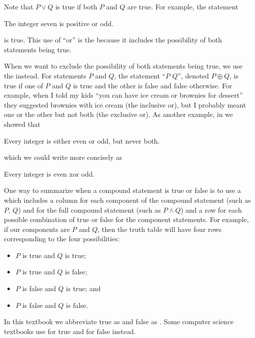 \begin{defn}
\begin{apart}
        \item Note that $P \lor Q$ is true if both $P$ and $Q$ are true.  For example, the statement 
            \begin{center}
                The integer seven is positive or odd.
            \end{center} 
        is true.  This use of ``or'' is the  because it includes the possibility of both statements being true.
        
        \item When we want to exclude the possibility of both statements being true, we use the  instead. For statements $P$ and $Q$, the statement ``$P$  $Q$'', denoted $P \oplus Q$, is true if one of $P$ and $Q$ is true and the other is false and false otherwise.  For example, when I told my kids ``you can have ice cream or brownies for dessert'' they suggested brownies with ice cream (the inclusive or), but I probably meant one or the other but not both (the exclusive or).  As another example, in  
        we showed that 
            \begin{center}
                Every integer is either even or odd, but never both.
            \end{center}
        which we could write more concisely as
            \begin{center}
                Every integer is even xor odd.
            \end{center} 

        \item One way to summarize when a compound statement is true or false is to use a  which includes a column for each component of the compound statement (such as $P$, $Q$) and for the full compound statement (such as $P \land Q$) and  a row for each possible combination of true or false for the component statements.  For example, if our components are $P$ and $Q$, then the truth table will have four rows corresponding to the four possibilities:
            \begin{itemize}
                \item $P$ is true and $Q$ is true;
                \item $P$ is true and $Q$ is false;
                \item $P$ is false and $Q$ is true; and
                \item $P$ is false and $Q$ is false.
            \end{itemize}
        In this textbook we abbreviate true as  and false as .  Some computer science textbooks use  for true and  for false instead. 
    \end{apart}   
\end{defn}


